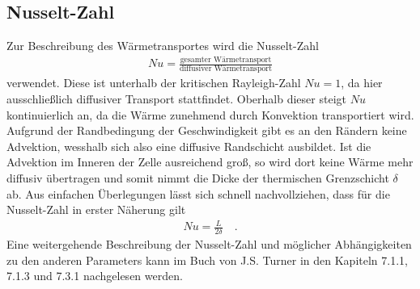 \documentclass[12pt,a4paper,titlepage,headinclude]{scrartcl}
\numberwithin{equation}{subsection}
\begin{document}
\subsection{Nusselt-Zahl}
Zur Beschreibung des Wärmetransportes wird die Nusselt-Zahl
\begin{align*}
	Nu=\frac{\text{gesamter Wärmetransport}}{\text{diffusiver Wärmetransport}}
\end{align*}
verwendet.
Diese ist unterhalb der kritischen Rayleigh-Zahl $Nu=1$, da hier ausschließlich diffusiver Transport stattfindet.
Oberhalb dieser steigt $Nu$ kontinuierlich an, da die Wärme zunehmend durch Konvektion transportiert wird.
Aufgrund der Randbedingung der Geschwindigkeit gibt es an den Rändern keine Advektion, wesshalb sich also eine diffusive Randschicht ausbildet.
Ist die Advektion im Inneren der Zelle ausreichend groß, so wird dort keine Wärme mehr diffusiv übertragen und somit nimmt die Dicke der thermischen Grenzschicht $\delta$ ab.
Aus einfachen Überlegungen lässt sich schnell nachvollziehen, dass für die Nusselt-Zahl in erster Näherung gilt
\begin{align}
	Nu=\frac{L}{2\delta}\quad.
\end{align}
Eine weitergehende Beschreibung der Nusselt-Zahl und möglicher Abhängigkeiten zu den anderen Parameters kann im Buch von J.S. Turner \cite{Bef} in den Kapiteln 7.1.1, 7.1.3 und 7.3.1 nachgelesen werden.
\end{document}
